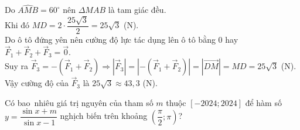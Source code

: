 \documentclass[12pt,a4paper,openany,oneside]{book}
\begin{document}
\begin{bt}
{		Do  $\widehat{AMB}=60^\circ$ nên $\Delta MAB$ là tam giác đều. \\Khi đó $MD=2\cdot \dfrac{25\sqrt{3}}{2}=25\sqrt{3}$ (N).\\
		Do ô tô đứng yên nên cường độ lực tác dụng lên ô tô bằng $0$  hay $\overrightarrow{F}_1+\overrightarrow{F}_2+\overrightarrow{F}_3=\overrightarrow{0}$.\\
		Suy  ra
		$\overrightarrow{F}_3=-(\overrightarrow{F}_1+\overrightarrow{F}_2) 
		\Rightarrow \left|\overrightarrow{F}_3\right|=\left| -(\overrightarrow{F}_1+\overrightarrow{F}_2)\right| 
		=\left|\overrightarrow{DM}\right|=MD=25\sqrt{3}$ (N).\\ 
		Vậy cường độ của $\overrightarrow{F}_3$ là $25\sqrt{3}\approx  43{,}3$ (N).
	 }
\end{bt}

\begin{bt}%
	Có bao~nhiêu giá trị nguyên của tham số $m$ thuộc $[-2024;2024]$ để hàm số $y = \dfrac{\sin  x + m}{\sin x - 1}$ nghịch biến trên khoảng $\left(\dfrac{\pi}{2}; \pi\right)$?
\end{bt}
\end{document}
